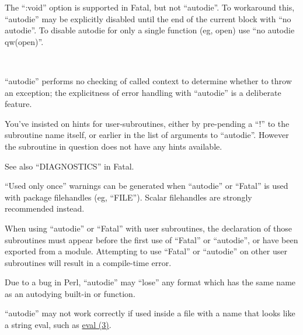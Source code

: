 \documentclass[]{article}
\renewcommand{\emph}[1]{\underline{#1}}
\begin{document}
\begin{description}
\itemsep1pt\parskip0pt
\item[:void cannot be used with lexical scope]
The ``:void'' option is supported in Fatal, but not ``autodie''. To
workaround this, ``autodie'' may be explicitly disabled until the end of
the current block with ``no autodie''. To disable autodie for only a
single function (eg, open) use ``no autodie qw(open)''.

~

``autodie'' performs no checking of called context to determine whether
to throw an exception; the explicitness of error handling with
``autodie'' is a deliberate feature.
\end{description}

\begin{description}
\itemsep1pt\parskip0pt
\item[No user hints defined for \%s]
You've insisted on hints for user-subroutines, either by pre-pending a
``!'' to the subroutine name itself, or earlier in the list of arguments
to ``autodie''. However the subroutine in question does not have any
hints available.
\end{description}

See also ``DIAGNOSTICS'' in Fatal.


``Used only once'' warnings can be generated when ``autodie'' or
``Fatal'' is used with package filehandles (eg, ``FILE''). Scalar
filehandles are strongly recommended instead.

When using ``autodie'' or ``Fatal'' with user subroutines, the
declaration of those subroutines must appear before the first use of
``Fatal'' or ``autodie'', or have been exported from a module.
Attempting to use ``Fatal'' or ``autodie'' on other user subroutines
will result in a compile-time error.

Due to a bug in Perl, ``autodie'' may ``lose'' any format which has the
same name as an autodying built-in or function.

``autodie'' may not work correctly if used inside a file with a name
that looks like a string eval, such as \emph{eval (3)}.

\end{document}

